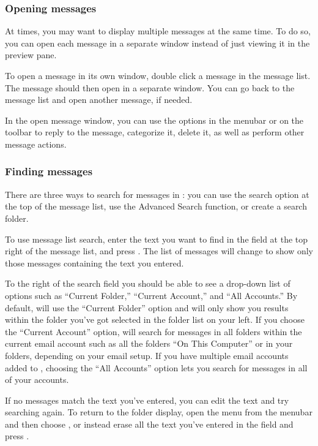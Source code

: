 \subsubsection{Opening messages}

At times, you may want to display multiple messages at the same time. To 
do so, you can open each message in a separate window instead of just viewing
it in the preview pane.

To open a message in its own window, double click a message in the message
list. The message should then open in a separate window. You can go back to 
the message list and open another message, if needed.

In the open message window, you can use the options in the menubar or on the
toolbar to reply to the message, categorize it, delete it, as well as perform
other message actions.

\subsubsection{Finding messages}


There are three ways to search for messages in : you can use the
search option at the top of the message list, use the Advanced Search function,
or create a search folder.

To use message list search, enter the text you want to find in the 
 field at the top right of the message list, and press 
. The list of messages will change to show only those messages containing the text you entered. 

To the right of the search field you should be able to see a drop-down list 
of options such as ``Current Folder,'' ``Current Account,'' and 
``All Accounts.'' By default,  will use the ``Current Folder'' option
and will only show you results within the folder you've got selected in the
folder list on your left. If you choose the ``Current Account'' option, 
 will search for messages in all folders within the current email
account \dash such as all the folders ``On This Computer'' or in your 
folders, depending on your email setup. If you have multiple email accounts
added to , choosing the ``All Accounts'' option lets you search for 
messages in all of your accounts.

If no messages match the text you've entered, you can edit the text and
try searching again. To return to the folder display, open the 
menu from the menubar and then choose , or instead erase all the
text you've entered in the  field and press .


